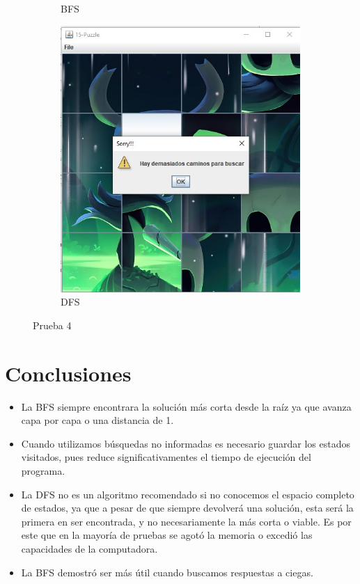 \begin{figure}[!h]
\begin{subfigure}{0.3\textwidth}
            \caption{BFS}
          \end{subfigure}
          \hfill
          \begin{subfigure}{0.3\textwidth}
            \includegraphics[width=\textwidth]{Imagenes/dfs5.jpg}
            \caption{DFS}
          \end{subfigure}
          \caption{Prueba 4}
        \end{figure}

\section{Conclusiones}
    \begin{itemize}
        \item La BFS siempre encontrara la solución más corta desde la raíz ya que avanza capa por capa o una distancia de 1.
        \item Cuando utilizamos búsquedas no informadas es necesario guardar los estados visitados, pues reduce significativamentes el tiempo de ejecución del programa.
        \item  La DFS no es un algoritmo recomendado si no conocemos el espacio completo de estados, ya que a pesar de que siempre devolverá una solución, esta será la primera en ser encontrada, y no necesariamente la más corta o viable. Es por este que en la mayoría de pruebas se agotó la memoria o excedió las capacidades de la computadora.
        \item La BFS demostró ser más útil cuando buscamos respuestas a ciegas.
    \end{itemize}